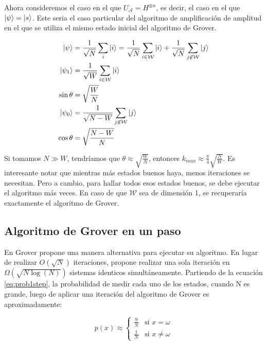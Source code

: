 Ahora consideremos el caso en el que $U_\mathcal{A} = H^{\otimes n}$, es decir, el caso en el que $\ket{\psi} = \ket{s}$. Este seria el caso particular del algoritmo de amplificación de amplitud en el que se utiliza el mismo estado inicial del algoritmo de Grover.

\begin{align}
    \ket{\psi} &= \frac{1}{\sqrt{N}} \sum\limits_i \ket{i} = \frac{1}{\sqrt{N}} \sum\limits_{i \in \mathcal{W}} \ket{i} + \frac{1}{\sqrt{N}} \sum\limits_{j \not\in \mathcal{W}} \ket{j} \\
    \ket{\psi_1} &= \frac{1}{\sqrt{W}} \sum\limits_{i \in \mathcal{W}} \ket{i} \\
    \sin{\theta} &= \sqrt{\frac{W}{N}} \\
    \ket{\psi_0} &= \frac{1}{\sqrt{N-W}} \sum\limits_{j \not\in \mathcal{W}} \ket{j} \\
    \cos{\theta} &= \sqrt{\frac{N-W}{N}}
\end{align}

Si tomamos $N \gg W$, tendríamos que $\theta \approx \sqrt{\frac{W}{N}}$, entonces $k_{max} \approx \frac{\pi}{4} \sqrt{\frac{N}{W}}$. Es interesante notar que mientras más estados buenos haya, menos iteraciones se necesitan. Pero a cambio, para hallar todos esos estados buenos, se debe ejecutar el algoritmo más veces. En caso de que $\mathcal{W}$ sea de dimensión 1, se recuperaría exactamente el algoritmo de Grover.

\subsection{Algoritmo de Grover en un paso}

En \cite{Grover_1997s} Grover propone una manera alternativa para ejecutar su algoritmo. En lugar de realizar $O(\sqrt{N})$ iteraciones, propone realizar una sola iteración en $\Omega(\sqrt{N \log(N)})$ sistemas identicos simultáneamente. Partiendo de la ecuación \ref{eq:prob1step}, la probabilidad de medir cada uno de los estados, cuando N es grande, luego de aplicar una iteración del algoritmo de Grover es aproximadamente:

\begin{equation}
    p(x) \approx
    \begin{cases}
        \frac{9}{N} & \text{si } x = \omega \\
        \frac{1}{N} & \text{si } x \neq \omega
    \end{cases}
\end{equation}

